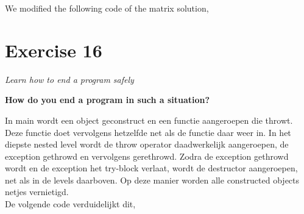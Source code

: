 \documentclass[12pt]{article}
\newcommand{\desc}[1]{\textit{#1} \vspace{1em}}
\begin{document}
We modified the following code of the matrix solution,















\clearpage
\section*{Exercise 16}
\desc{Learn how to end a program safely}

\textbf{How do you end a program in such a situation?}

In main wordt een object geconstruct en een functie aangeroepen die throwt. Deze functie doet vervolgens hetzelfde net als de functie daar weer in. In het diepste nested level wordt de throw operator daadwerkelijk aangeroepen, de exception gethrowd en vervolgens gerethrowd. Zodra de exception gethrowd wordt en de exception het try-block verlaat, wordt de destructor aangeroepen, net als in de levels daarboven.
Op deze manier worden alle constructed objects netjes vernietigd.\\

De volgende code verduidelijkt dit,










\end{document}
